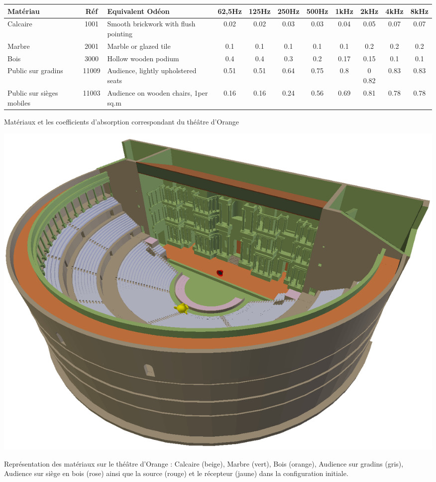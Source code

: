 \begin{tableth} 
\footnotesize
	\begin{tabular}{| m{1.5cm} | c | m{2cm} | *{8}{c|}}
		\hline
		Matériau &Réf & Equivalent Odéon & 62,5Hz & 125Hz & 250Hz & 500Hz & 1kHz & 2kHz & 4kHz & 8kHz \\
		  \hline
		  \hline
		   Calcaire & 1001 & Smooth brickwork with flush pointing\footnotemark & 0.02&	0.02&	0.03&	0.03&	0.04&	0.05&	0.07&	0.07 \\
		   \hline
		Marbre &2001 & Marble or glazed tile\footnotemark & 0.1 & 0.1 & 0.1 & 0.1 & 0.1 & 0.2 & 0.2 & 0.2 \\
		   \hline
		Bois & 3000 & Hollow wooden podium\footnotemark & 0.4&0.4&0.3&	0.2&	0.17& 0.15& 0.1&	0.1 \\
		   \hline
		Public sur gradins & 11009 & Audience, lightly upholstered seats\footnotemark & 0.51&	0.51&	0.64&	0.75&	0.8&0	0.82&	0.83&	0.83 \\
	     \hline
	     	Public sur sièges mobiles & 11003 & Audience on wooden chairs, 1per sq.m\footnotemark & 0.16 & 0.16 & 0.24 & 0.56 & 0.69 & 0.81 & 0.78 & 0.78 \\
	     \hline

	 \end{tabular}
	\caption{Matériaux et les coefficients d'absorption correspondant du théâtre d'Orange}
	\label{matOdeon}
\end{tableth}
\addtocounter{footnote}{-1}
\addtocounter{footnote}{-1}
\addtocounter{footnote}{-1}
\addtocounter{footnote}{1}
\addtocounter{footnote}{1}

\begin{figureth}
	\includegraphics[width=\linewidth]{images/theatreMat}
	\caption{Représentation des matériaux sur le théâtre d'Orange : Calcaire (beige), Marbre (vert), Bois (orange), Audience sur gradins (gris), Audience sur siège en bois (rose) ainsi que la source (rouge) et le récepteur (jaune) dans la configuration initiale.}
	\label{theatreMat}
\end{figureth}

